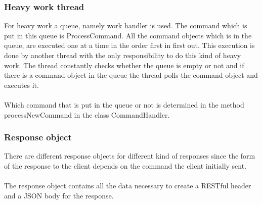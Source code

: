 \subsubsection{Heavy work thread}
For heavy work a queue, namely work handler is used. The command which is put in this queue is ProcessCommand. All the command objects which is in the queue, are executed one at a time  in the order first in first out. This execution is done by another thread with the only responsibility to do this kind of heavy work. The thread constantly checks whether the queue is empty or not and if there is a command object in the queue the thread polls the command object and executes it.\\
\\
Which command that is put in the queue or not is determined in the method processNewCommand  in the class CommandHandler. 
\subsubsection{Response object}
There are different response objects for different kind of responses since the form of the response to the client depends on the command the client initially sent.\\
\\
The response object contains all the data necessary to create a RESTful header and a JSON body for the response.
